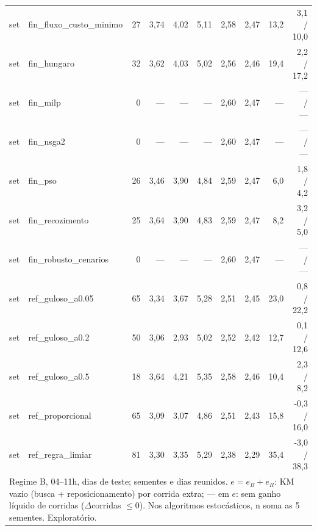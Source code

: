 \begin{tabular}{llrrrrrrrr}
set & fin\_fluxo\_custo\_minimo & 27 & 3{,}74 & 4{,}02 & 5{,}11 & 2{,}58 & 2{,}47 & 13{,}2 & 3{,}1 / 10{,}0 \\
set & fin\_hungaro & 32 & 3{,}62 & 4{,}03 & 5{,}02 & 2{,}56 & 2{,}46 & 19{,}4 & 2{,}2 / 17{,}2 \\
set & fin\_milp & 0 & --- & --- & --- & 2{,}60 & 2{,}47 & --- & --- / --- \\
set & fin\_nsga2 & 0 & --- & --- & --- & 2{,}60 & 2{,}47 & --- & --- / --- \\
set & fin\_pso & 26 & 3{,}46 & 3{,}90 & 4{,}84 & 2{,}59 & 2{,}47 & 6{,}0 & 1{,}8 / 4{,}2 \\
set & fin\_recozimento & 25 & 3{,}64 & 3{,}90 & 4{,}83 & 2{,}59 & 2{,}47 & 8{,}2 & 3{,}2 / 5{,}0 \\
set & fin\_robusto\_cenarios & 0 & --- & --- & --- & 2{,}60 & 2{,}47 & --- & --- / --- \\
set & ref\_guloso\_a0.05 & 65 & 3{,}34 & 3{,}67 & 5{,}28 & 2{,}51 & 2{,}45 & 23{,}0 & 0{,}8 / 22{,}2 \\
set & ref\_guloso\_a0.2 & 50 & 3{,}06 & 2{,}93 & 5{,}02 & 2{,}52 & 2{,}42 & 12{,}7 & 0{,}1 / 12{,}6 \\
set & ref\_guloso\_a0.5 & 18 & 3{,}64 & 4{,}21 & 5{,}35 & 2{,}58 & 2{,}46 & 10{,}4 & 2{,}3 / 8{,}2 \\
set & ref\_proporcional & 65 & 3{,}09 & 3{,}07 & 4{,}86 & 2{,}51 & 2{,}43 & 15{,}8 & -0{,}3 / 16{,}0 \\
set & ref\_regra\_limiar & 81 & 3{,}30 & 3{,}35 & 5{,}29 & 2{,}38 & 2{,}29 & 35{,}4 & -3{,}0 / 38{,}3 \\
\hline
\multicolumn{10}{l}{\footnotesize Regime B, 04--11h, dias de teste; sementes e dias reunidos. $e = e_B + e_R$: KM vazio (busca + reposicionamento) por corrida extra; --- em $e$: sem ganho líquido de corridas ($\Delta$corridas $\le 0$). Nos algoritmos estocásticos, n soma as 5 sementes. Exploratório.} \\
\end{tabular}
